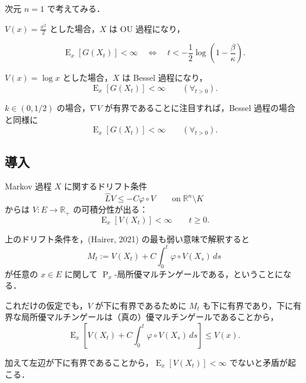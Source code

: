 \documentclass[
]{article}
\begin{document}
\begin{tcolorbox}[enhanced jigsaw, opacityback=0, breakable, toprule=.15mm, left=2mm, colback=white, colframe=quarto-callout-tip-color-frame, bottomrule=.15mm, leftrule=.75mm, arc=.35mm, rightrule=.15mm]

次元 \(n=1\) で考えてみる．

\(V(x)=\frac{x^2}{2}\) とした場合，\(X\) は OU 過程になり，

\[
\operatorname{E}_x[G(X_t)]<\infty\quad\Leftrightarrow\quad t<-\frac{1}{2}\log\left(1-\frac{\beta}{\kappa}\right).
\]

\(V(x)=\log x\) とした場合，\(X\) は Bessel 過程になり， \[
\operatorname{E}_x[G(X_t)]<\infty\qquad(\forall_{t>0}).
\]

\(k\in(0,1/2)\) の場合，\(\nabla V\)
が有界であることに注目すれば，Bessel 過程の場合と同様に \[
\operatorname{E}_x[G(X_t)]<\infty\qquad(\forall_{t>0}).
\]

\end{tcolorbox}

\subsection{導入}\label{ux5c0eux5165}

Markov 過程 \(X\) に関するドリフト条件 \[
\widehat{L}V\le-C\varphi\circ V\qquad\mathrm{on}\;\mathbb{R}^n\setminus K
\] からは \(V:E\to\mathbb{R}_+\) の可積分性が出る： \[
\operatorname{E}_x[V(X_t)]<\infty\qquad t\ge0.
\]

\begin{tcolorbox}[enhanced jigsaw, bottomtitle=1mm, breakable, toprule=.15mm, left=2mm, colback=white, opacitybacktitle=0.6, opacityback=0, toptitle=1mm, titlerule=0mm, title={証明}, arc=.35mm, colframe=quarto-callout-note-color-frame, rightrule=.15mm, bottomrule=.15mm, coltitle=black, leftrule=.75mm, colbacktitle=quarto-callout-note-color!10!white]

上のドリフト条件を，(Hairer, 2021) の最も弱い意味で解釈すると \[
M_t:=V(X_t)+C\int^t_0\varphi\circ V(X_s)\,ds
\] が任意の \(x\in E\) に関して
\(\operatorname{P}_x\)-局所優マルチンゲールである，ということになる．

これだけの仮定でも，\(V\) が下に有界であるために \(M_t\)
も下に有界であり，下に有界な局所優マルチンゲールは（真の）優マルチンゲールであることから，
\[
\operatorname{E}_x\left[V(X_t)+C\int^t_0\varphi\circ V(X_s)\,ds\right]\le V(x).
\]

加えて左辺が下に有界であることから，\(\operatorname{E}_x[V(X_t)]<\infty\)
でないと矛盾が起こる．

\end{tcolorbox}
\end{document}

